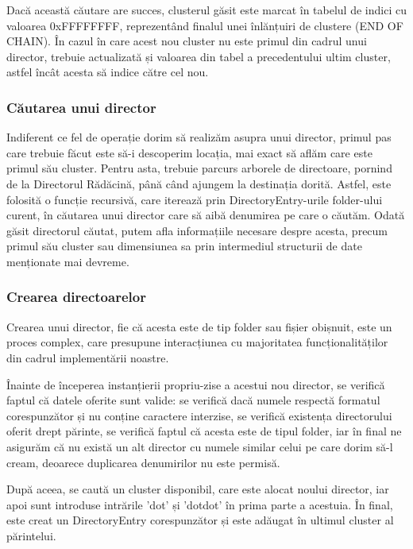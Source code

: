 Dacă această căutare are succes, clusterul găsit este marcat în tabelul de indici cu valoarea 0xFFFFFFFF, reprezentând finalul unei înlănțuiri de clustere (END OF CHAIN). În cazul în care acest nou cluster nu este primul din cadrul unui director, trebuie actualizată și valoarea din tabel a precedentului ultim cluster, astfel încât acesta să indice către cel nou.


\subsubsection{Căutarea unui director}

Indiferent ce fel de operație dorim să realizăm asupra unui director, primul pas care trebuie făcut este să-i descoperim locația, mai exact să aflăm care este primul său cluster. Pentru asta, trebuie parcurs arborele de directoare, pornind de la Directorul Rădăcină, până când ajungem la destinația dorită. Astfel, este folosită o funcție recursivă, care iterează prin DirectoryEntry-urile folder-ului curent, în căutarea unui director care să aibă denumirea pe care o căutăm. Odată găsit directorul căutat, putem afla informațiile necesare despre acesta, precum primul său cluster sau dimensiunea sa prin intermediul structurii de date menționate mai devreme.


\subsubsection{Crearea directoarelor}

Crearea unui director, fie că acesta este de tip folder sau fișier obișnuit, este un proces complex, care presupune interacțiunea cu majoritatea funcționalităților din cadrul implementării noastre.

Înainte de începerea instanțierii propriu-zise a acestui nou director, se verifică faptul că datele oferite sunt valide: se verifică dacă numele respectă formatul corespunzător și nu conține caractere interzise, se verifică existența directorului oferit drept părinte, se verifică faptul că acesta este de tipul folder, iar în final ne asigurăm că nu există un alt director cu numele similar celui pe care dorim să-l cream, deoarece duplicarea denumirilor nu este permisă.

După aceea, se caută un cluster disponibil, care este alocat noului director, iar apoi sunt introduse intrările 'dot' și 'dotdot' în prima parte a acestuia. În final, este creat un DirectoryEntry corespunzător și este adăugat în ultimul cluster al părintelui.


